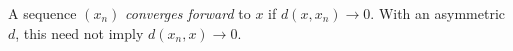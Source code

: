
A sequence $(x_n)$ \emph{converges forward} to $x$ if $d(x,x_n)\to0$. With an asymmetric $d$, this need not imply $d(x_n,x)\to0$.
